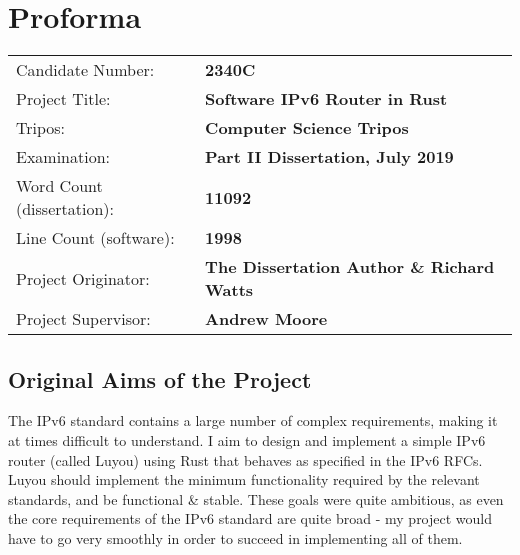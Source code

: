 \documentclass[12pt,a4paper,twoside,openany]{report}
\begin{document}

\pagestyle{plain}

\chapter*{Proforma}

{\large
\begin{tabular}{ll}
Candidate Number:          & \bf 2340C                      \\
Project Title:             & \bf Software IPv6 Router in Rust \\
Tripos:                    & \bf Computer Science Tripos  \\
Examination:               & \bf Part II Dissertation, July 2019  \\
Word Count (dissertation): & \bf 11092\footnotemark[1]  \\
Line Count (software):     & \bf 1998\footnotemark[2] \\
Project Originator:        & \bf The Dissertation Author \& Richard Watts \\
Project Supervisor:        & \bf Andrew Moore \\
\end{tabular}
}



\section*{Original Aims of the Project}

The IPv6 standard\cite{ipv6_rfc} contains a large number of complex requirements, making it at times difficult to understand. I aim to design and implement a simple IPv6 router (called Luyou) using Rust\cite{rust} that behaves as specified in the IPv6 RFCs. Luyou should implement the minimum functionality required by the relevant standards, and be functional \&  stable.  These goals were quite ambitious, as even the core requirements of the IPv6 standard are quite broad - my project would have to go very smoothly in order to succeed in implementing all of them.
\end{document}
